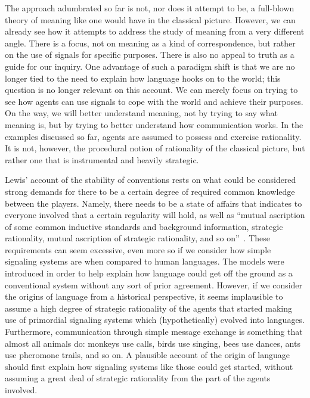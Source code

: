 \documentclass[a4paper]{article}
\begin{document}
The approach adumbrated so far is not, nor does it attempt to be, a full-blown theory of meaning like one would have in the classical picture.
However, we can already see how it attempts to address the study of meaning from a very different angle.
There is a focus, not on meaning as a kind of correspondence, but rather on the use of signals for specific purposes.
There is also no appeal to truth as a guide for our inquiry.
One advantage of such a paradigm shift is that we are no longer tied to the need to explain how language hooks on to the world; this question is no longer relevant on this account.
We can merely focus on trying to see how agents can use signals to cope with the world and achieve their purposes.
On the way, we will better understand meaning, not by trying to say what meaning is, but by trying to better understand how communication works.
In the examples discussed so far, agents are assumed to possess and exercise rationality.
It is not, however, the procedural notion of rationality of the classical picture, but rather one that is instrumental and heavily strategic.


Lewis' account of the stability of conventions rests on what could be considered strong demands for there to be a certain degree of required common knowledge between the players.
Namely, there needs to be a state of affairs that indicates to everyone involved that a certain regularity will hold, as well as ``mutual ascription of some common inductive standards and background information, strategic rationality, mutual ascription of strategic rationality, and so on''~\parencite*[56--57]{lewis_convention_1969}.
These requirements can seem excessive, even more so if we consider how simple signaling systems are when compared to human languages.
The models were introduced in order to help explain how language could get off the ground as a conventional system without any sort of prior agreement.
However, if we consider the origins of language from a historical perspective, it seems implausible to assume a high degree of strategic rationality of the agents that started making use of primordial signaling systems which (hypothetically) evolved into languages.
Furthermore, communication through simple message exchange is something that almost all animals do: monkeys use calls, birds use singing, bees use dances, ants use pheromone trails, and so on.
A plausible account of the origin of language should first explain how signaling systems like those could get started, without assuming a great deal of strategic rationality from the part of the agents involved.
\end{document}
